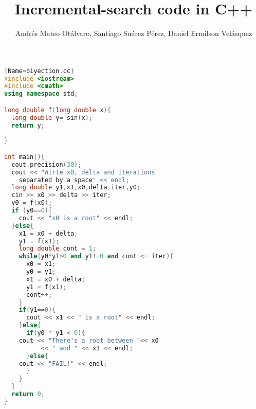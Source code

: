 \documentclass{article}
\author{Andrés Mateo Otálvaro, Santiago Suárez Pérez, Daniel Ermilson Velásquez}
\title{Incremental-search code in C++}
\begin{document}
\maketitle
\begin{lstlisting}[language=C++, caption=Incremental-search algorithm in c++]{Name=biyection.cc}
#include <iostream>
#include <cmath>
using namespace std;

long double f(long double x){
  long double y= sin(x);
  return y;
  
}

int main(){
  cout.precision(30);
  cout << "Wirte x0, delta and iterations 
    separated by a space" << endl;
  long double y1,x1,x0,delta,iter,y0;
  cin >> x0 >> delta >> iter;
  y0 = f(x0);
  if (y0==0){
    cout << "x0 is a root" << endl;
  }else{
    x1 = x0 + delta;
    y1 = f(x1);
    long double cont = 1;
    while(y0*y1>0 and y1!=0 and cont <= iter){
      x0 = x1;
      y0 = y1;
      x1 = x0 + delta;
      y1 = f(x1);
      cont++;
    }
    if(y1==0){
      cout << x1 << " is a root" << endl;
    }else{
      if(y0 * y1 < 0){
	cout << "There's a root between "<< x0 
          << " and " << x1 << endl;
      }else{
	cout << "FAIL!" << endl;
      }
    }
  }
  return 0;
}

\end{lstlisting}
\end{document}
